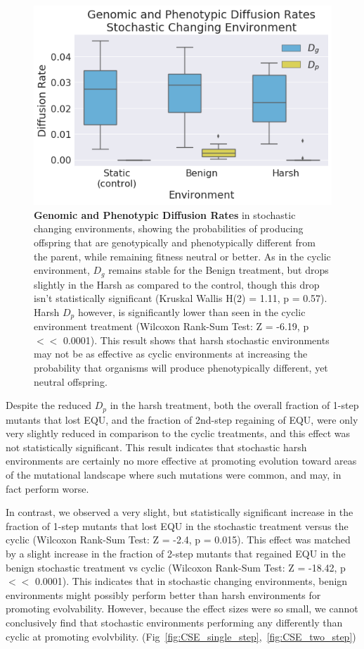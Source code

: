 \documentclass[PhD]{msu-thesis}
\begin{document}
	\begin{figure}[!h] %
	\includegraphics[width=0.75\columnwidth]{figures/CE/CSE_D_g_D_p__box.png}
	\caption{\textbf{Genomic and Phenotypic Diffusion Rates} in stochastic changing environments, showing the probabilities of producing offspring that are genotypically and phenotypically different from the parent, while remaining fitness neutral or better. As in the cyclic environment, $D_g$ remains stable for the Benign treatment, but drops slightly in the Harsh as compared to the control, though this drop isn't statistically significant (Kruskal Wallis H(2) = 1.11, p = 0.57). Harsh $D_p$ however, is significantly lower than seen in the cyclic environment treatment (Wilcoxon Rank-Sum Test: Z = -6.19, p $<<$ 0.0001). This result shows that harsh stochastic environments may not be as effective as cyclic environments at increasing the probability that organisms will produce phenotypically different, yet neutral offspring.
	}\label{fig:CSE_diffusion_rate}
	\end{figure}

Despite the reduced $D_p$ in the harsh treatment, both the overall fraction of 1-step mutants that lost EQU, and the fraction of 2nd-step regaining of EQU, were only very slightly reduced in comparison to the cyclic treatments, and this effect was not statistically significant. This result indicates that stochastic harsh environments are certainly no more effective at promoting evolution toward areas of the mutational landscape where such mutations were common, and may, in fact perform worse. 

In contrast, we observed a very slight, but statistically significant increase in the fraction of 1-step mutants that lost EQU in the stochastic treatment versus the cyclic (Wilcoxon Rank-Sum Test: Z = -2.4, p = 0.015). This effect was matched by a slight increase in the fraction of 2-step mutants that regained EQU in the benign stochastic treatment vs cyclic (Wilcoxon Rank-Sum Test: Z = -18.42, p $<<$ 0.0001). This indicates that in stochastic changing environments, benign environments might possibly perform better than harsh environments for promoting evolvability. However, because the effect sizes were so small, we cannot conclusively find that stochastic environments performing any differently than cyclic at promoting evolvbility.
(Fig~\ref{fig:CSE_single_step},~\ref{fig:CSE_two_step})
\end{document}
